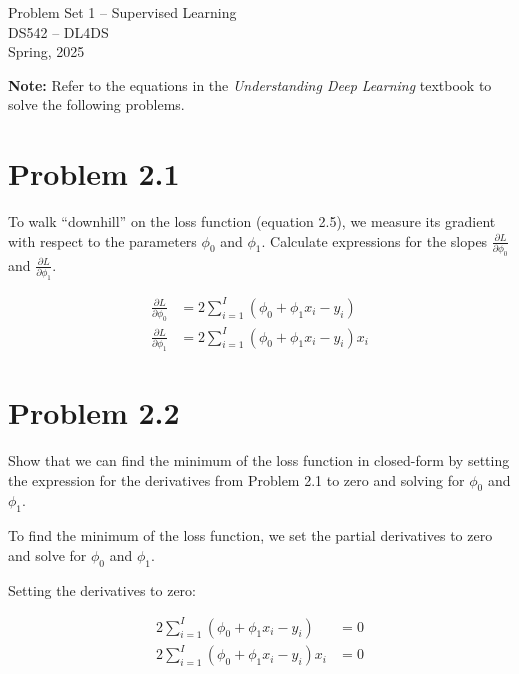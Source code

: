 \documentclass[10pt]{article}
\begin{document}
\begin{center}
    \LARGE {Problem Set 1 – Supervised Learning} \\[1em]
    \Large{DS542 – DL4DS} \\[0.5em]
    \large Spring, 2025
\end{center}

\vspace{2em}

\noindent\textbf{Note:} Refer to the equations in the \textit{Understanding Deep Learning} textbook to solve the following problems.

\vspace{2em}

\section*{Problem 2.1}

To walk “downhill” on the loss function (equation 2.5), we measure its gradient with respect to the parameters $\phi_0$ and $\phi_1$. Calculate expressions for the slopes $\frac{\partial L}{\partial \phi_0}$ and $\frac{\partial L}{\partial \phi_1}$.


\begin{align*}
\frac{\partial L}{\partial \phi_0} &= 2\sum_{i=1}^{I} (\phi_0 + \phi_1 x_i - y_i) \\[1em]
\frac{\partial L}{\partial \phi_1} &= 2\sum_{i=1}^{I} (\phi_0 + \phi_1 x_i - y_i)x_i
\end{align*}

\vspace{2em}

\section*{Problem 2.2}

Show that we can find the minimum of the loss function in closed-form by setting the expression for the derivatives from Problem 2.1 to zero and solving for $\phi_0$ and $\phi_1$.

To find the minimum of the loss function, we set the partial derivatives to zero and solve for $\phi_0$ and $\phi_1$.

Setting the derivatives to zero:

\begin{align*}
2\sum_{i=1}^{I} (\phi_0 + \phi_1 x_i - y_i) &= 0 \\
2\sum_{i=1}^{I} (\phi_0 + \phi_1 x_i - y_i)x_i &= 0
\end{align*}
\end{document}
